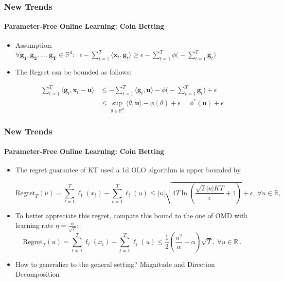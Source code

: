 \documentclass{beamer}
\newcommand{\R}{\mathbb{R}}
\newcommand{\uu}{\mathbf{u}}
\newcommand{\x}{\mathbf{x}}
\begin{document}
\begin{frame}
\frametitle{New Trends}
\framesubtitle{Parameter-Free Online Learning: Coin Betting}
\begin{itemize}

\item Assumption: $\forall \mathbf{g_1}, \mathbf{g_2}, \dots, \mathbf{g_T} \in \mathbb{R}^d: \;\; \epsilon - \sum_{t = 1}^{T}\langle\x_t, \mathbf{g}_t\rangle \geq \epsilon - \sum_{t = 1}^{T} \phi\big(-\sum_{t = 1}^{T} \mathbf{g}_t\big)$

\vspace{0.5cm}
\pause
\item  The Regret can be bounded as follows:

\begin{align*}
\sum_{t = 1}^{T}\langle \mathbf{g}_t, \x_t - \uu \rangle &\leq - \sum_{t = 1}^{T}\langle \mathbf{g}_t, \uu\rangle - \phi\big(-\sum_{t = 1}^{T} \mathbf{g}_t\big) + \epsilon\\
&\leq \sup_{\theta \in \mathbb{R}^d} \langle \theta, \uu \rangle - \phi(\theta) + \epsilon = \phi^*(\uu) + \epsilon
\end{align*}

\end{itemize}
\end{frame}

\begin{frame}
\frametitle{New Trends}
\framesubtitle{Parameter-Free Online Learning: Coin Betting}

\begin{itemize}


\item The regret guarantee of KT used a 1d OLO algorithm is upper bounded by

\small{\[
\mathrm{Regret}_T(u)
=\sum_{t=1}^T \ell_t(x_t) - \sum_{t=1}^T \ell_t(u)
\leq |u| \sqrt{4 T \ln \left(\frac{\sqrt{2} |u| K T }{\epsilon}+1\right)} + \epsilon, \ \forall u \in \R,
\]}

\item To better appreciate this regret, compare this bound to the one of OMD with learning rate $\eta=\frac{\alpha}{\sqrt{T}}$:
\[
\mathrm{Regret}_T(u)
=\sum_{t=1}^T \ell_t(x_t) -\sum_{t=1}^T \ell_t(u)
\leq \frac{1}{2}\left(\frac{u^2}{\alpha}+\alpha\right)\sqrt{T}, \ \forall u \in \R~.
\]

\pause

\item How to generalize to the general setting? Magnitude and Direction Decomposition

\end{itemize}
\end{frame}
\end{document}
